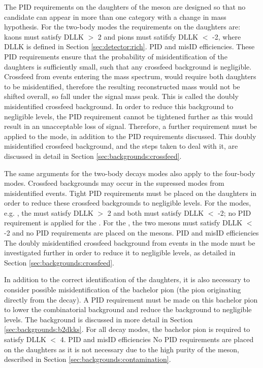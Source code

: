 The PID requirements on the daughters of the \Dz meson are designed so that no  candidate can appear in more than one category with a change in mass hypothesis. For the two-body \Dz modes the requirements on the \Dz daughters are: kaons must satisfy DLLK $>$ 2 and pions must satifsfy DLLK $<$ -2, where DLLK is defined in Section \ref{sec:detector:rich}. {\color{red}PID and misID efficiencies}. These PID requirements ensure that the probability of misidentification of the \Dz daughters is sufficiently small, such that any crossfeed background is negligible. Crossfeed from \kpi events entering the \pik mass spectrum, would require both \Dz daughters to be misidentified, therefore the resulting reconstructed \Dz mass would not be shifted overall, so fall under the signal \Dz mass peak. This is called the doubly misidentified crossfeed background. In order to reduce this background to negligible levels, the PID requirement cannot be tightened further as this would result in an unacceptable loss of signal. Therefore, a further requirement must be applied to the \pik mode, in addition to the PID requirements discussed. This doubly misidentified crossfeed background, and the steps taken to deal with it, are discussed in detail in Section \ref{sec:backgrounds:crossfeed}.

The same arguments for the two-body \Dz decays modes also apply to the four-body modes. Crossfeed backgrounds may occur in the supressed \Dz modes from misidentified \kpipipi events. Tight PID requirements must be placed on the \Dz daughters in order to reduce these crossfeed backgrounds to negligible levels. For the \decay{\Dz}{\Kmp\pipm\pimp\pipm} modes, e.g. \decay{\Dz}{\Km\pip\pim\pip}, the \Km must satisfy DLLK $>$ 2 and both \pip must satisfy DLLK $<$ -2; no PID requirement is applied for the \pim. For the \decay{\Dz}{\pip\pim\pip\pim}, the two \pip mesons must satisfy DLLK $<$ -2 and no PID requirements are placed on the \pim mesons. {\color{red}PID and misID efficiencies} The doubly misidentified crossfeed background from \kpipipi events in the \pikpipi mode must be investigated further in order to reduce it to negligible levels, as detailed in Section \ref{sec:backgrounds:crossfeed}.

In addition to the correct identification of the \Dz daughters, it is also necessary to consider possible misidentification of the bachelor pion (the pion originating directly from the \Kstarm decay). A PID requirement must be made on this bachelor pion to lower the combinatorial background and reduce the \decay{\Bm}{\D\KS\Km} background to negligible levels. The \decay{\Bm}{\D\KS\Km} background is discussed in more detail in Section \ref{sec:backgrounds:b2dkks}. For all \Dz decay modes, the bachelor pion is required to satisfy DLLK $<$ 4. {\color{red}PID and misID efficiencies} No PID requirements are placed on the \KS daughters as it is not necessary due to the high purity of the \KS meson, described in Section \ref{sec:backgrounds:contamination}. 

